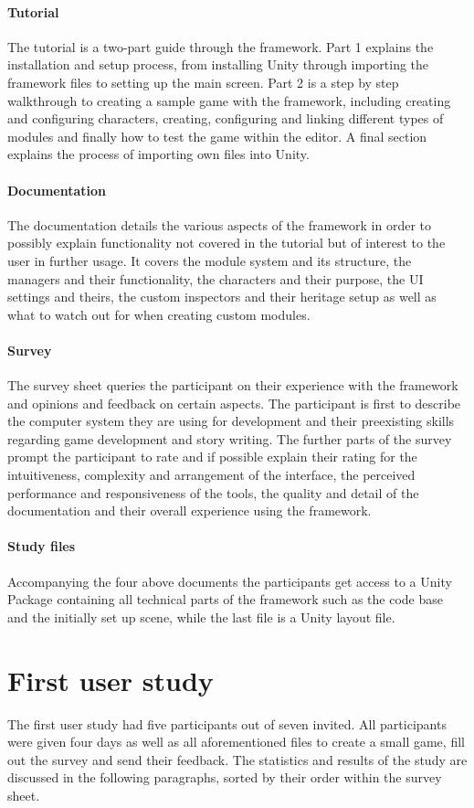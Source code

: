 \paragraph{Tutorial} The tutorial is a two-part guide through the framework. 
Part 1 explains the installation and setup process, from installing Unity through importing the framework files to setting up the main screen. 
Part 2 is a step by step walkthrough to creating a sample game with the framework, including creating and configuring characters, creating, configuring and linking different types of modules and finally how to test the game within the editor. A final section explains the process of importing own files into Unity.
\paragraph{Documentation} The documentation details the various aspects of the framework in order to possibly explain functionality not covered in the tutorial but of interest to the user in further usage. It covers the module system and its structure, the managers and their functionality, the characters and their purpose, the UI settings and theirs, the custom inspectors and their heritage setup as well as what to watch out for when creating custom modules.
\paragraph{Survey} The survey sheet queries the participant on their experience with the framework and opinions and feedback on certain aspects. The participant is first to describe the computer system they are using for development and their preexisting skills regarding game development and story writing. The further parts of the survey prompt the participant to rate and if possible explain their rating for the intuitiveness, complexity and arrangement of the interface, the perceived performance and responsiveness of the tools, the quality and detail of the documentation and their overall experience using the framework. 
\paragraph{Study files} Accompanying the four above documents the participants get access to a Unity Package containing all technical parts of the framework such as the code base and the initially set up scene, while the last file is a Unity layout file. 

\section{First user study}
The first user study had five participants out of seven invited. All participants were given four days as well as all aforementioned files to create a small game, fill out the survey and send their feedback. The statistics and results of the study are discussed in the following paragraphs, sorted by their order within the survey sheet.
